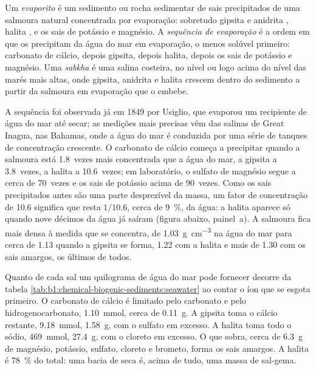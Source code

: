 \begin{definition}\label{def:b1:chemical-biogenic-sediments:evaporite}
Um \emph{evaporito} é um sedimento ou rocha sedimentar de sais precipitados
de uma salmoura natural concentrada por evaporação: sobretudo gipsita  e
anidrita , halita , e os sais de potássio e magnésio. A
\emph{sequência de evaporação} é a ordem em que os 
precipitam da água do mar em evaporação, o menos solúvel primeiro: carbonato de cálcio,
depois gipsita, depois halita, depois os sais de potássio e magnésio. Uma
\emph{sabkha} é uma salina costeira, no nível ou logo acima do nível das marés
mais altas, onde gipsita, anidrita e halita crescem dentro do sedimento a partir da salmoura
em evaporação que o embebe.
\end{definition}

A sequência foi observada já em 1849 por Usiglio, que evaporou um recipiente de água do
mar até secar; as medições mais precisas vêm das salinas de Great Inagua, nas Bahamas,
onde a água do mar é conduzida por uma série de tanques de concentração crescente. O
carbonato de cálcio começa a precipitar quando a salmoura está 1.8~vezes mais concentrada
que a água do mar, a gipsita a 3.8~vezes, a halita a 10.6~vezes; em laboratório, o sulfato
de magnésio segue a cerca de 70~vezes e os sais de potássio acima de 90~vezes. Como os
sais precipitados antes são uma parte desprezível da massa, um fator de concentração de
10.6 significa que resta $1/10.6$, cerca de \qty{9}{\%}, da água: a halita aparece só quando
nove décimos da água já saíram (figura abaixo, painel~a). A salmoura fica mais densa à
medida que se concentra, de \qty{1.03}{g.cm^{-3}} na água do mar para cerca de \num{1.13}
quando a gipsita se forma, \num{1.22} com a halita e mais de \num{1.30} com os sais
amargos, os últimos de todos.

Quanto de cada sal um quilograma de água do mar pode fornecer decorre da tabela
\cref{tab:b1:chemical-biogenic-sediments:seawater} ao contar o íon que se esgota primeiro.
O carbonato de cálcio é limitado pelo carbonato e pelo hidrogenocarbonato, \qty{1.10}{mmol},
cerca de \qty{0.11}{g}. A gipsita toma o cálcio restante, \qty{9.18}{mmol}, \qty{1.58}{g},
com o sulfato em excesso. A halita toma todo o sódio, \qty{469}{mmol}, \qty{27.4}{g}, com o
cloreto em excesso. O que sobra, cerca de \qty{6.3}{g} de magnésio, potássio, sulfato,
cloreto e brometo, forma os sais amargos. A halita é \qty{78}{\%} do total: uma bacia de
 seca é, acima de tudo, uma massa de sal-gema.

